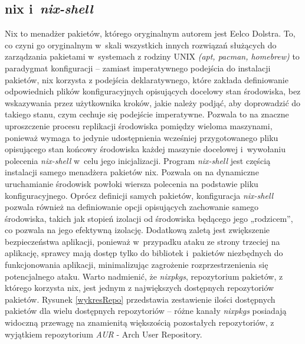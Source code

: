 \subsection{nix i~\textit{nix-shell}}
Nix to menadżer pakietów, którego oryginalnym autorem jest Eelco Dolstra\cite{nix-repo}. To, co czyni go oryginalnym w~skali wszystkich innych rozwiązań służących do zarządzania pakietami w~systemach z rodziny UNIX \textit{(apt, pacman, homebrew)} to paradygmat konfiguracji -- zamiast imperatywnego podejścia do instalacji pakietów, nix korzysta z podejścia deklaratywnego, które zakłada definiowanie odpowiednich plików konfiguracyjnych opisujących docelowy stan środowiska, bez wskazywania przez użytkownika kroków, jakie należy podjąć, aby doprowadzić do takiego stanu, czym cechuje się podejście imperatywne. Pozwala to na znaczne uproszczenie procesu replikacji środowiska pomiędzy wieloma maszynami, ponieważ wymaga to jedynie udostępnienia wcześniej przygotowanego pliku opisującego stan końcowy środowiska każdej maszynie docelowej i~wywołaniu polecenia \textit{nix-shell} w~celu jego inicjalizacji. 
\newline \noindent Program \textit{nix-shell} jest częścią instalacji samego menadżera pakietów nix. Pozwala on na dynamiczne uruchamianie środowisk powłoki wiersza polecenia na podstawie pliku konfiguracyjnego\cite{nix-shell}. Oprócz definicji samych pakietów, konfiguracja \textit{nix-shell} pozwala również na definiowanie opcji opisujących zachowanie samego środowiska, takich jak stopień izolacji od środowiska będącego jego „rodzicem”, co pozwala na jego efektywną izolację. Dodatkową zaletą jest zwiększenie bezpieczeństwa aplikacji, ponieważ w~przypadku ataku ze strony trzeciej na aplikację, sprawcy mają dostęp tylko do bibliotek i~pakietów niezbędnych do funkcjonowania aplikacji, minimalizując zagrożenie rozprzestrzenienia się potencjalnego ataku.
\newline \noindent Warto nadmienić, że \textit{nixpkgs}, repozytorium pakietów, z którego korzysta nix, jest jednym z największych dostępnych repozytoriów pakietów. Rysunek \ref{wykresRepo} przedstawia zestawienie ilości dostępnych pakietów dla wielu dostępnych repozytoriów -- różne kanały \textit{nixpkgs} posiadają widoczną przewagę na znamienitą większością pozostałych repozytoriów, z wyjątkiem repozytorium \textit{AUR} - Arch User Repository.

